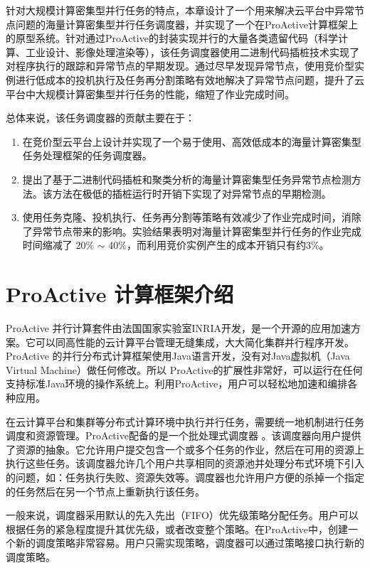 针对大规模计算密集型并行任务的特点，本章设计了一个用来解决云平台中异常节点问题的海量计算密集型并行任务调度器，并实现了一个在ProActive计算框架上的原型系统。针对通过ProActive的封装实现并行的大量各类遗留代码（科学计算、工业设计、影像处理渲染等），该任务调度器使用二进制代码插桩技术实现了对程序执行的跟踪和异常节点的早期发现。通过尽早发现异常节点，使用竞价型实例进行低成本的投机执行及任务再分割策略有效地解决了异常节点问题，提升了云平台中大规模计算密集型并行任务的性能，缩短了作业完成时间。

总体来说，该任务调度器的贡献主要在于：
\begin{enumerate}
\item 在竞价型云平台上设计并实现了一个易于使用、高效低成本的海量计算密集型任务处理框架的任务调度器。
\item 提出了基于二进制代码插桩和聚类分析的海量计算密集型任务异常节点检测方法。该方法在极低的插桩运行时开销下实现了对异常节点的早期检测。
\item 使用任务克隆、投机执行、任务再分割等策略有效减少了作业完成时间，消除了异常节点带来的影响。实验结果表明对海量计算密集型并行任务的作业完成时间缩减了 20\% $\sim$ 40\%，而利用竞价实例产生的成本开销只有约3\%。
\end{enumerate}

\section{ProActive 计算框架介绍}
ProActive \cite{ProActive} 并行计算套件由法国国家实验室INRIA开发，是一个开源的应用加速方案。它可以同高性能的云计算平台管理无缝集成，大大简化集群并行程序开发。ProActive 的并行分布式计算框架使用Java语言开发，没有对Java虚拟机（Java Virtual Machine）做任何修改。所以 ProActive的扩展性非常好，可以运行在任何支持标准Java环境的操作系统上。利用ProActive，用户可以轻松地加速和编排各种应用。

在云计算平台和集群等分布式计算环境中执行并行任务，需要统一地机制进行任务调度和资源管理。ProActive配备的是一个批处理式调度器 \cite{pascheduling}。该调度器向用户提供了资源的抽象。它允许用户提交包含一个或多个任务的作业，然后在可用的资源上执行这些任务。该调度器允许几个用户共享相同的资源池并处理分布式环境下引入的问题，如：任务执行失败、资源失效等。调度器也允许用户方便的杀掉一个指定的任务然后在另一个节点上重新执行该任务。

一般来说，调度器采用默认的先入先出（FIFO）优先级策略分配任务。用户可以根据任务的紧急程度提升其优先级，或者改变整个策略。在ProActive中，创建一个新的调度策略非常容易。用户只需实现策略，调度器可以通过策略接口执行新的调度策略。

